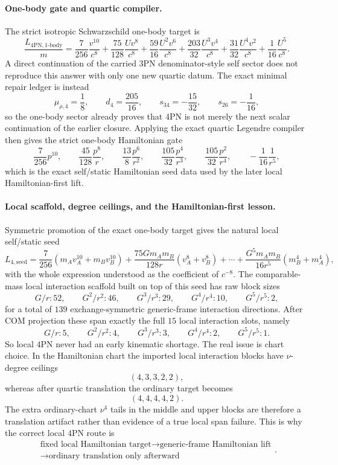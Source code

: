 \documentclass[11pt]{article}
\begin{document}
\paragraph{One-body gate and quartic compiler.}
The strict isotropic Schwarzschild one-body target is
\[
\frac{L_{4\mathrm{PN},1\text{-body}}}{m}
=
\frac{7}{256}\frac{v^{10}}{c^8}
+\frac{75}{128}\frac{Uv^8}{c^8}
+\frac{59}{16}\frac{U^2v^6}{c^8}
+\frac{203}{32}\frac{U^3v^4}{c^8}
+\frac{31}{32}\frac{U^4v^2}{c^8}
+\frac{1}{16}\frac{U^5}{c^8}.
\]
A direct continuation of the carried $3$PN denominator-style self sector does
not reproduce this answer with only one new quartic datum.  The exact minimal
repair ledger is instead
\[
\mu_{\rho,4}=\frac18,
\qquad
 d_4=\frac{205}{16},
\qquad
 s_{34}=-\frac{15}{32},
\qquad
 s_{26}=-\frac1{16},
\]
so the one-body sector already proves that $4$PN is not merely the next scalar
continuation of the earlier closure.  Applying the exact quartic Legendre
compiler then gives the strict one-body Hamiltonian gate
\[
\frac{7}{256}p^{10},
\qquad
\frac{45}{128}\frac{p^8}{r},
\qquad
\frac{13}{8}\frac{p^6}{r^2},
\qquad
\frac{105}{32}\frac{p^4}{r^3},
\qquad
\frac{105}{32}\frac{p^2}{r^4},
\qquad
-\frac{1}{16}\frac{1}{r^5},
\]
which is the exact self/static Hamiltonian seed data used by the later local
Hamiltonian-first lift.

\paragraph{Local scaffold, degree ceilings, and the Hamiltonian-first lesson.}
Symmetric promotion of the exact one-body target gives the natural local
self/static seed
\[
L_{4,\mathrm{seed}}=
\frac{7}{256}(m_A v_A^{10}+m_B v_B^{10})
+\frac{75Gm_A m_B}{128r}(v_A^8+v_B^8)
+\cdots
+\frac{G^5m_A m_B}{16r^5}(m_B^4+m_A^4),
\]
with the whole expression understood as the coefficient of $c^{-8}$.  The
comparable-mass local interaction scaffold built on top of this seed has raw
block sizes
\[
G/r:52,
\qquad
G^2/r^2:46,
\qquad
G^3/r^3:29,
\qquad
G^4/r^4:10,
\qquad
G^5/r^5:2,
\]
for a total of $139$ exchange-symmetric generic-frame interaction directions.
After COM projection these span exactly the full $15$ local interaction slots,
namely
\[
G/r:5,
\qquad
G^2/r^2:4,
\qquad
G^3/r^3:3,
\qquad
G^4/r^4:2,
\qquad
G^5/r^5:1.
\]
So local $4$PN never had an early kinematic shortage.  The real issue is chart
choice.  In the Hamiltonian chart the imported local interaction blocks have
$\nu$-degree ceilings
\[
(4,3,3,2,2),
\]
whereas after quartic translation the ordinary target becomes
\[
(4,4,4,4,2).
\]
The extra ordinary-chart $\nu^4$ tails in the middle and upper blocks are
therefore a translation artifact rather than evidence of a true local span
failure.  This is why the correct local $4$PN route is
\[
\begin{gathered}
\text{fixed local Hamiltonian target}
\longrightarrow
\text{generic-frame Hamiltonian lift}
\\
\longrightarrow
\text{ordinary translation only afterward}
\end{gathered}.
\]
\end{document}
